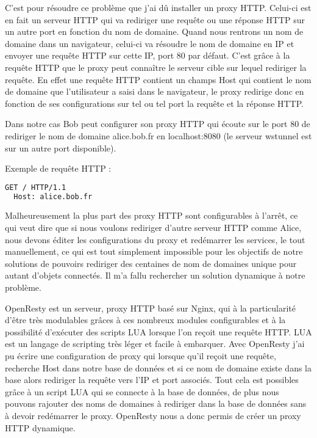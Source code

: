 C'est pour résoudre ce problème que j'ai dû installer un proxy HTTP. Celui-ci est en fait un serveur HTTP qui va rediriger une requête ou une réponse HTTP sur un autre port en fonction du nom de domaine. Quand nous rentrons un nom de domaine dans un navigateur, celui-ci va résoudre le nom de domaine en IP et envoyer une requête HTTP sur cette IP, port 80 par défaut. C'est grâce à la requête HTTP que le proxy peut connaître le serveur cible sur lequel rediriger la requête. En effet une requête HTTP contient un champs \og Host \fg qui contient le nom de domaine que l'utilisateur a saisi dans le navigateur, le proxy redirige donc en fonction de ses configurations sur tel ou tel port la requête et la réponse HTTP.

Dans notre cas Bob peut configurer son proxy HTTP qui écoute sur le port 80 de rediriger le nom de domaine \og alice.bob.fr \fg en \og localhost:8080 \fg (le serveur wstunnel est sur un autre port disponible).

\noindent Exemple de requête HTTP :
\begin{lstlisting}[language=bash]
  GET / HTTP/1.1
  Host: alice.bob.fr
\end{lstlisting}

Malheureusement la plus part des proxy HTTP sont configurables à l'arrêt, ce qui veut dire que si nous voulons rediriger d'autre serveur HTTP comme Alice, nous devons éditer les configurations du proxy et redémarrer les services, le tout manuellement, ce qui est tout simplement impossible pour les objectifs de notre solutions de pouvoirs rediriger des centaines de nom de domaines unique pour autant d'objets connectés. Il m'a fallu rechercher un solution dynamique à notre problème.

OpenResty est un serveur, proxy HTTP basé sur Nginx, qui à la particularité d'être très modulables grâces à ces nombreux modules configurables et à la possibilité d'exécuter des scripts LUA lorsque l'on reçoit une requête HTTP. LUA est un langage de scripting très léger et facile à embarquer. Avec OpenResty j'ai pu écrire une configuration de proxy qui lorsque qu'il reçoit une requête, recherche \og Host \fg{} dans notre base de données et si ce nom de domaine existe dans la base alors rediriger la requête vers l'IP et port associés. Tout cela est possibles grâce à un script LUA qui se connecte à la base de données, de plus nous pouvons rajouter des noms de domaines à rediriger dans la base de données sans à devoir redémarrer le proxy. OpenResty nous a donc permis de créer un proxy HTTP dynamique.

